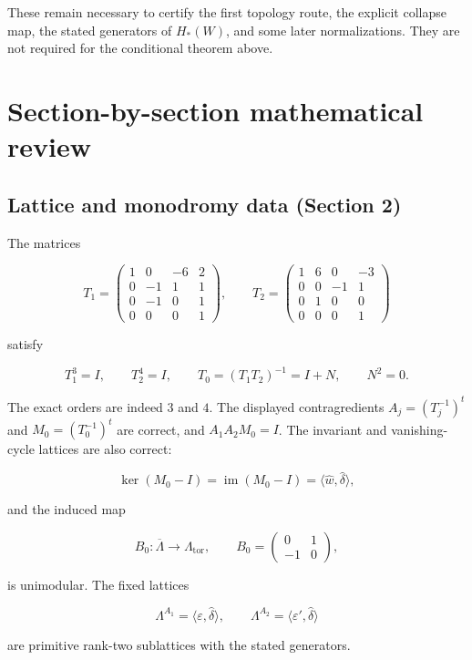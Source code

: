 \documentclass[
  10pt,
  letterpaper,
]{article}
\newcommand{\im}{\operatorname{im}}
\begin{document}
These remain necessary to certify the first topology route, the explicit
collapse map, the stated generators of \(H_*(W)\), and some later
normalizations. They are not required for the conditional theorem above.

\section{Section-by-section mathematical
review}\label{section-by-section-mathematical-review}

\subsection{Lattice and monodromy data (Section
2)}\label{lattice-and-monodromy-data-section-2}

The matrices

\[
T_1=\begin{pmatrix}
1&0&-6&2\\0&-1&1&1\\0&-1&0&1\\0&0&0&1
\end{pmatrix},\qquad
T_2=\begin{pmatrix}
1&6&0&-3\\0&0&-1&1\\0&1&0&0\\0&0&0&1
\end{pmatrix}
\]

satisfy

\[
T_1^3=I,\qquad T_2^4=I,\qquad T_0=(T_1T_2)^{-1}=I+N,\qquad N^2=0.
\]

The exact orders are indeed \(3\) and \(4\). The displayed
contragredients \(A_j=(T_j^{-1})^t\) and \(M_0=(T_0^{-1})^t\) are
correct, and \(A_1A_2M_0=I\). The invariant and vanishing-cycle lattices
are also correct:

\[
\ker(M_0-I)=\im(M_0-I)=\langle\widehat w,\widehat\delta\rangle,
\]

and the induced map

\[
B_0:\overline\Lambda\to\Lambda_{\mathrm{tor}},\qquad
B_0=\begin{pmatrix}0&1\\-1&0\end{pmatrix},
\]

is unimodular. The fixed lattices

\[
\Lambda^{A_1}=\langle\varepsilon,\widehat\delta\rangle,
\qquad
\Lambda^{A_2}=\langle\varepsilon',\widehat\delta\rangle
\]

are primitive rank-two sublattices with the stated generators.
\end{document}
